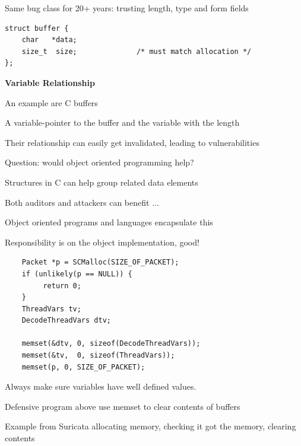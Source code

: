 \documentclass[Screen16to9,17pt]{foils}
\begin{document}
\begin{list1}
\item Same bug class for 20+ years: trusting length, type and form fields
\end{list1}




\begin{verbatim}
struct buffer {
    char   *data;
    size_t  size;              /* must match allocation */
};
\end{verbatim}

\begin{list2}
\item {\bf Variable Relationship}
\item An example are C buffers
\item A variable-pointer to the buffer and the variable with the length
\item Their relationship can easily get invalidated, leading to vulnerabilities
\item Question: would object oriented programming help?
\end{list2}



\begin{list2}
\item Structures in C can help group related data elements
\item Both auditors and attackers can benefit ...
\item Object oriented programs and languages encapsulate this
\item Responsibility is on the object implementation, good!
\end{list2}



\begin{verbatim}
    Packet *p = SCMalloc(SIZE_OF_PACKET);
    if (unlikely(p == NULL)) {
         return 0;
    }
    ThreadVars tv;
    DecodeThreadVars dtv;

    memset(&dtv, 0, sizeof(DecodeThreadVars));
    memset(&tv,  0, sizeof(ThreadVars));
    memset(p, 0, SIZE_OF_PACKET);
\end{verbatim}

\begin{list2}
\item Always make sure variables have well defined values.
\item Defensive program above use memset to clear contents of buffers
\item Example from Suricata allocating memory, checking it got the memory, clearing contents
\end{list2}
\end{document}
